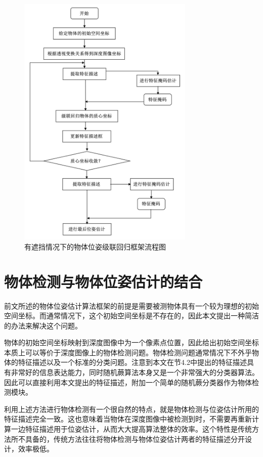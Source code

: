 \begin{figure}[htb]
	\centering 
	\includegraphics[width=0.75\textwidth]{./mypic/有遮挡情况下的物体位姿级联回归框架流程图.jpg} 
	\caption{有遮挡情况下的物体位姿级联回归框架流程图} 
\end{figure}


\section{物体检测与物体位姿估计的结合}

前文所述的物体位姿估计算法框架的前提是需要被测物体具有一个较为理想的初始空间坐标。而通常情况下，这个初始空间坐标是不存在的，因此本文提出一种简洁的办法来解决这个问题。

物体的初始空间坐标映射到深度图像中为一个像素点位置，因此给出初始空间坐标本质上可以等价于深度图像上的物体检测问题。物体检测问题通常情况下不外乎物体的特征描述以及一个标准的分类问题。注意到本文在节4.2中提出的特征描述具有非常好的信息表达能力，同时随机蕨算法本身又是一个非常强大的分类器算法。因此可以直接利用本文提出的特征描述，附加一个简单的随机蕨分类器作为物体检测模块。

利用上述方法进行物体检测有一个很自然的特点，就是物体检测与位姿估计所用的特征描述完全一致。这也意味着当物体在深度图像中被检测到时，不需要再重新计算一边特征描述用于位姿估计，从而大大提高算法整体的效率。这个特性是传统方法所不具备的，传统方法往往将物体检测与物体位姿估计两者的特征描述分开设计，效率极低。

